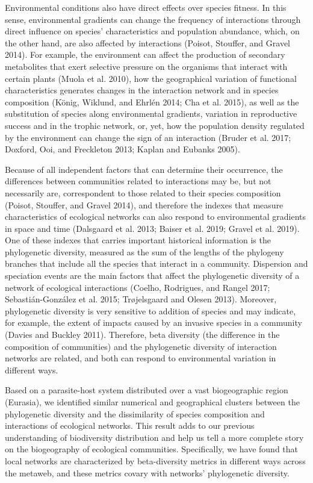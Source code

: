 \documentclass[12pt]{article}
\begin{document}
Environmental conditions also have direct effects over species fitness.
In this sense, environmental gradients can change the frequency of
interactions through direct influence on species' characteristics and
population abundance, which, on the other hand, are also affected by
interactions (Poisot, Stouffer, and Gravel 2014). For example, the
environment can affect the production of secondary metabolites that
exert selective pressure on the organisms that interact with certain
plants (Muola et al. 2010), how the geographical variation of functional
characteristics generates changes in the interaction network and in
species composition (König, Wiklund, and Ehrlén 2014; Cha et al. 2015),
as well as the substitution of species along environmental gradients,
variation in reproductive success and in the trophic network, or, yet,
how the population density regulated by the environment can change the
sign of an interaction (Bruder et al. 2017; Doxford, Ooi, and Freckleton
2013; Kaplan and Eubanks 2005).

Because of all independent factors that can determine their occurrence,
the differences between communities related to interactions may be, but
not necessarily are, correspondent to those related to their species
composition (Poisot, Stouffer, and Gravel 2014), and therefore the
indexes that measure characteristics of ecological networks can also
respond to environmental gradients in space and time (Dalsgaard et al.
2013; Baiser et al. 2019; Gravel et al. 2019). One of these indexes that
carries important historical information is the phylogenetic diversity,
measured as the sum of the lengths of the phylogeny branches that
include all the species that interact in a community. Dispersion and
speciation events are the main factors that affect the phylogenetic
diversity of a network of ecological interactions (Coelho, Rodrigues,
and Rangel 2017; Sebastián-González et al. 2015; Trøjelsgaard and Olesen
2013). Moreover, phylogenetic diversity is very sensitive to addition of
species and may indicate, for example, the extent of impacts caused by
an invasive species in a community (Davies and Buckley 2011). Therefore,
beta diversity (the difference in the composition of communities) and
the phylogenetic diversity of interaction networks are related, and both
can respond to environmental variation in different ways.

Based on a parasite-host system distributed over a vast biogeographic
region (Eurasia), we identified similar numerical and geographical
clusters between the phylogenetic diversity and the dissimilarity of
species composition and interactions of ecological networks. This result
adds to our previous understanding of biodiversity distribution and help
us tell a more complete story on the biogeography of ecological
communities. Specifically, we have found that local networks are
characterized by beta-diversity metrics in different ways across the
metaweb, and these metrics covary with networks' phylogenetic diversity.
\end{document}
